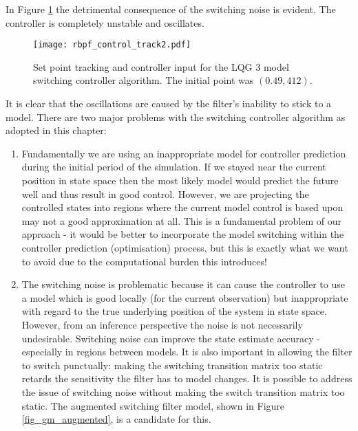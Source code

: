 In Figure \ref{fig_rbpf_control_track2} the detrimental consequence of the switching noise is evident. The controller is completely unstable and oscillates.
\begin{figure}[H] 
\centering
\texttt{[image: rbpf\_control\_track2.pdf]}
\caption{Set point tracking and controller input for the LQG 3 model switching controller algorithm. The initial point was $(0.49, 412)$.}
\label{fig_rbpf_control_track2}
\end{figure}
It is clear that the oscillations are caused by the filter's inability to stick to a model. There are two major problems with the switching controller algorithm as adopted in this chapter:
\begin{enumerate}
\item
Fundamentally we are using an inappropriate model for controller prediction during the initial period of the simulation. If we stayed near the current position in state space then the most likely model would predict the future well and thus result in good control. However, we are projecting the controlled states into regions where the current model control is based upon may not a good approximation at all. This is a fundamental problem of our approach - it would be better to incorporate the model switching within the controller prediction (optimisation) process, but this is exactly what we want to avoid due to the computational burden this introduces!
\item
The switching noise is problematic because it can cause the controller to use a model which is good locally (for the current observation) but inappropriate with regard to the true underlying position of the system in state space. However, from an inference perspective the noise is not necessarily undesirable. Switching noise can improve the state estimate accuracy - especially in regions between models. It is also important in allowing the filter to switch punctually: making the switching transition matrix too static retards the sensitivity the filter has to model changes. It is possible to address the issue of switching noise without making the switch transition matrix too static. The augmented switching filter model, shown in Figure \ref{fig_gm_augmented}, is a candidate for this.
\begin{figure}[H] 
\centering
{}
\end{figure}
\end{enumerate}
